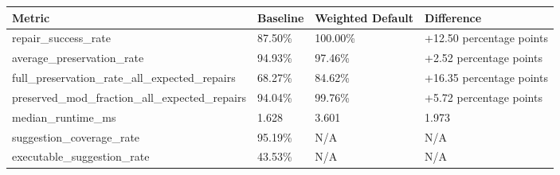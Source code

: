 \begin{tabular}{llll}
\hline
Metric & Baseline & Weighted Default & Difference \\
\hline
repair\_success\_rate & 87.50\% & 100.00\% & +12.50 percentage points \\
average\_preservation\_rate & 94.93\% & 97.46\% & +2.52 percentage points \\
full\_preservation\_rate\_all\_expected\_repairs & 68.27\% & 84.62\% & +16.35 percentage points \\
preserved\_mod\_fraction\_all\_expected\_repairs & 94.04\% & 99.76\% & +5.72 percentage points \\
median\_runtime\_ms & 1.628 & 3.601 & 1.973 \\
suggestion\_coverage\_rate & 95.19\% & N/A & N/A \\
executable\_suggestion\_rate & 43.53\% & N/A & N/A \\
\hline
\end{tabular}
